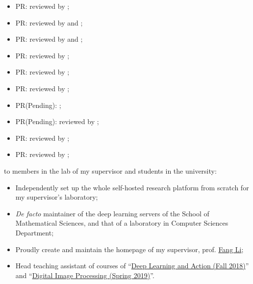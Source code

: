 \begin{itemize}
    \item PR:  reviewed by \mbauman;
    \item PR:  reviewed by \evizero and \timholy;
    \item PR:  reviewed by \evizero and \timholy;
    \item PR:  reviewed by \julio;
    \item PR:  reviewed by \evizero;
    \item PR:  reviewed by \timholy;
    \item PR(Pending): ;
    \item PR(Pending):  reviewed by \mikeinnes;
    \item PR:  reviewed by \mikeinnes;
    \item PR:  reviewed by \mikeinnes;
\end{itemize}
to members in the lab of my supervisor and students in the university:
\begin{itemize}
    \item Independently set up the whole self-hosted research platform from scratch for my supervisor's laboratory;
    \item \textit{De facto} maintainer of the deep learning servers of the School of Mathematical Sciences, and that of a laboratory in Computer Sciences Department;
    \item Proudly create and maintain the homepage of my supervisor, prof. \href{http://math.ecnu.edu.cn/~fli/}{\textsf{Fang Li}};
    \item Head teaching assistant of courses of ``\href{http://math.ecnu.edu.cn/~fli/Teaching/DeepLearning/Fall2018/index.html}{Deep Learning and Action (Fall 2018)}''  and ``\href{http://math.ecnu.edu.cn/~fli/Teaching/DigitalImageProcessing/Spring2019/index.html}{Digital Image Processing (Spring 2019)}''.
\end{itemize}

